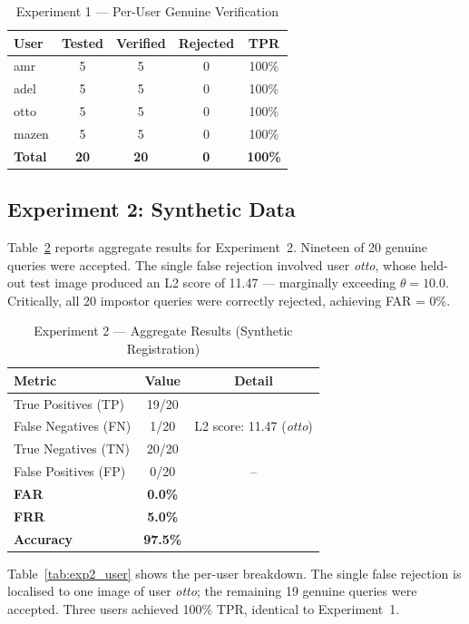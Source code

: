 \documentclass[conference]{IEEEtran}
\begin{document}
\begin{table}[H]
\centering
\caption{Experiment 1 — Per-User Genuine Verification}
\label{tab:exp1_user}
\renewcommand{\arraystretch}{1.2}
\begin{tabular}{lcccc}
\toprule
User & Tested & Verified & Rejected & TPR \\
\midrule
amr   & 5 & 5 & 0 & 100\% \\
adel  & 5 & 5 & 0 & 100\% \\
otto  & 5 & 5 & 0 & 100\% \\
mazen & 5 & 5 & 0 & 100\% \\
\midrule
\textbf{Total} & \textbf{20} & \textbf{20} & \textbf{0} & \textbf{100\%} \\
\bottomrule
\end{tabular}
\end{table}

\subsection{Experiment 2: Synthetic Data}

Table~\ref{tab:exp2} reports aggregate results for Experiment~2. Nineteen of 20 genuine queries were accepted. The single false rejection involved user \textit{otto}, whose held-out test image produced an L2 score of 11.47 — marginally exceeding $\theta = 10.0$. Critically, all 20 impostor queries were correctly rejected, achieving FAR = 0\%.

\begin{table}[H]
\centering
\caption{Experiment 2 — Aggregate Results (Synthetic Registration)}
\label{tab:exp2}
\renewcommand{\arraystretch}{1.2}
\begin{tabular}{lcc}
\toprule
Metric & Value & Detail \\
\midrule
True Positives (TP) & 19/20 & \\
False Negatives (FN) & 1/20 & L2 score: 11.47 (\textit{otto}) \\
True Negatives (TN) & 20/20 & \\
False Positives (FP) & 0/20 & -- \\
\midrule
\textbf{FAR} & \textbf{0.0\%} & \\
\textbf{FRR} & \textbf{5.0\%} & \\
\textbf{Accuracy} & \textbf{97.5\%} & \\
\bottomrule
\end{tabular}
\end{table}

Table~\ref{tab:exp2_user} shows the per-user breakdown. The single false rejection is localised to one image of user \textit{otto}; the remaining 19 genuine queries were accepted. Three users achieved 100\% TPR, identical to Experiment~1.
\end{document}
